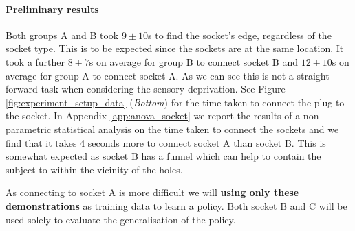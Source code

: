 \documentclass[final,3p,times,twocolumn]{elsarticle}
\begin{document}


\paragraph{Preliminary results}

Both groups A and B took $9\pm10$s to find the socket's edge, regardless of the socket type. This is to be expected since the sockets 
are at the same location. It took a further $8\pm7$s on average for group B to connect
socket B and $12\pm10$s on average for group A to connect socket A. As we can see this is not a straight forward task when considering
the sensory deprivation. See Figure \ref{fig:experiment_setup_data} (\textit{Bottom}) for the time taken to connect the plug to the socket.
In Appendix \ref{app:anova_socket} we report the results of a non-parametric statistical analysis on the time taken to connect
the sockets and we find that it takes 4 seconds more to connect socket A than socket B. This is somewhat expected as 
socket B has a funnel which can help to contain the subject to within the vicinity of the holes.

As connecting to socket A is more difficult we will \textbf{using only these demonstrations} as training data to learn a policy. Both
socket B and C will be used solely to evaluate the generalisation of the policy.
\end{document}
